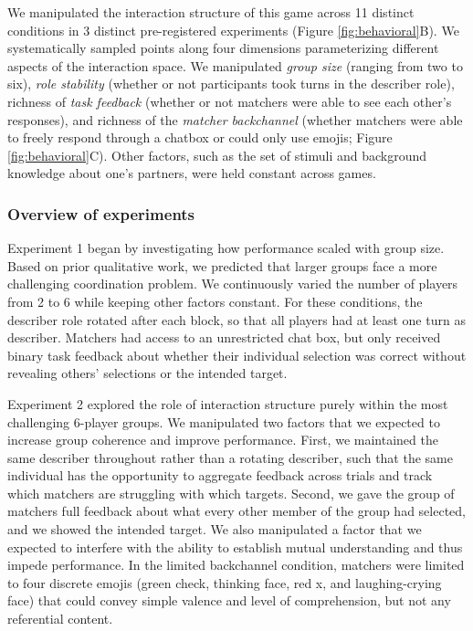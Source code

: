 \documentclass[
  english,
]{article}
\begin{document}
We manipulated the interaction structure of this game across 11 distinct conditions in 3 distinct pre-registered experiments (Figure \ref{fig:behavioral}B).
We systematically sampled points along four dimensions parameterizing different aspects of the interaction space.
We manipulated \emph{group size} (ranging from two to six), \emph{role stability} (whether or not participants took turns in the describer role), richness of \emph{task feedback} (whether or not matchers were able to see each other's responses), and richness of the \emph{matcher backchannel} (whether matchers were able to freely respond through a chatbox or could only use emojis; Figure \ref{fig:behavioral}C).
Other factors, such as the set of stimuli and background knowledge about one's partners, were held constant across games.

\subsubsection{Overview of experiments}\label{overview-of-experiments}

Experiment 1 began by investigating how performance scaled with group size.
Based on prior qualitative work, we predicted that larger groups face a more challenging coordination problem.
We continuously varied the number of players from 2 to 6 while keeping other factors constant.
For these conditions, the describer role rotated after each block, so that all players had at least one turn as describer.
Matchers had access to an unrestricted chat box, but only received binary task feedback about whether their individual selection was correct without revealing others' selections or the intended target.

Experiment 2 explored the role of interaction structure purely within the most challenging 6-player groups.
We manipulated two factors that we expected to increase group coherence and improve performance.
First, we maintained the same describer throughout rather than a rotating describer, such that the same individual has the opportunity to aggregate feedback across trials and track which matchers are struggling with which targets.
Second, we gave the group of matchers full feedback about what every other member of the group had selected, and we showed the intended target.
We also manipulated a factor that we expected to interfere with the ability to establish mutual understanding and thus impede performance.
In the limited backchannel condition, matchers were limited to four discrete emojis (green check, thinking face, red x, and laughing-crying face) that could convey simple valence and level of comprehension, but not any referential content.
\end{document}
